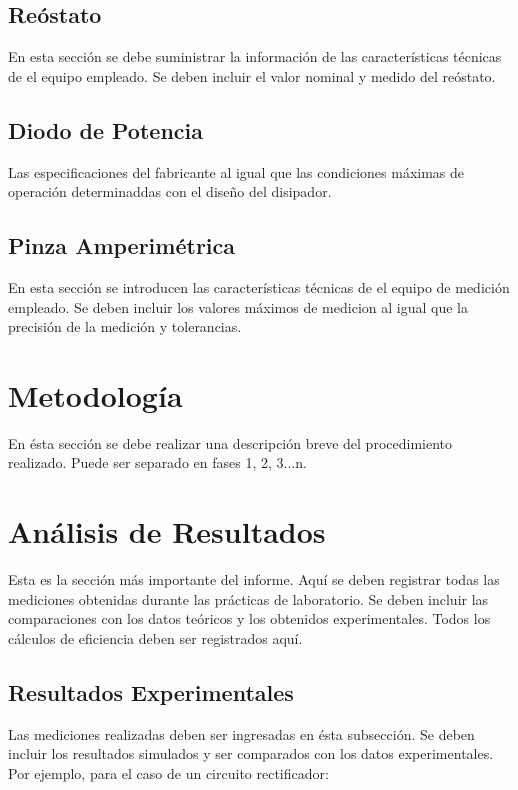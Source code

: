 \documentclass[letterpaper, 12pt]{report}
\begin{document}
\subsection{Re\'ostato}

En esta secci\'on se debe suministrar la informaci\'on de las caracter\'isticas t\'ecnicas de el equipo empleado. Se deben incluir el valor nominal y medido del re\'ostato. 

\subsection{Diodo de Potencia}

Las especificaciones del fabricante al igual que las condiciones m\'aximas de operaci\'on determinaddas con el dise\~no del disipador.  

\subsection{Pinza Amperim\'etrica}

En esta secci\'on se introducen las caracter\'isticas t\'ecnicas de el equipo de medici\'on empleado. Se deben incluir los valores m\'aximos de medicion al igual que la precisi\'on de la medici\'on y tolerancias. 

\newpage

\section{Metodolog\'ia}

En \'esta secci\'on se debe realizar una descripci\'on breve del procedimiento realizado. Puede ser separado en fases 1, 2, 3...n. 

\newpage

\section{An\'alisis de Resultados}
Esta es la secci\'on m\'as importante del informe. Aqu\'i se deben registrar todas las mediciones obtenidas durante las pr\'acticas de laboratorio. Se deben incluir las comparaciones con los datos te\'oricos y los obtenidos experimentales. Todos los c\'alculos de eficiencia deben ser registrados aqu\'i. 

\subsection{Resultados Experimentales}
Las mediciones realizadas deben ser ingresadas en \'esta subsecci\'on. Se deben incluir los resultados simulados y ser comparados con los datos experimentales. Por ejemplo, para el caso de un circuito rectificador: 
\end{document}
